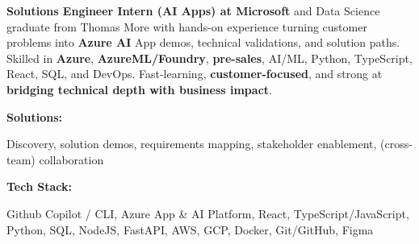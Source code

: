 \documentclass[8pt]{developercv} %
\begin{document}
\begin{minipage}[t]{0.46\textwidth}
	\vspace{-6pt}
 
	\textbf{Solutions Engineer Intern (AI Apps) at Microsoft} and Data Science graduate from Thomas More with hands-on experience turning customer problems into \textbf{Azure AI} App demos, technical validations, and solution paths. Skilled in \textbf{Azure}, \textbf{AzureML/Foundry}, \textbf{pre-sales}, AI/ML, Python, TypeScript, React, SQL, and DevOps. Fast-learning, \textbf{customer-focused}, and strong at \textbf{bridging technical depth with business impact}.
\end{minipage}
\hfill %
\begin{minipage}[t]{0.465\textwidth}
    \vspace{-6pt}
    
    \begin{minipage}[t]{0.2\textwidth}
        \textbf{Solutions:}
    \end{minipage}
    \hfill
    \begin{minipage}[t]{0.73\textwidth}
      Discovery, solution demos, requirements mapping, stakeholder enablement, (cross-team) collaboration
    \end{minipage}
    \vspace{1.5mm}
    
    \begin{minipage}[t]{0.2\textwidth}
        \textbf{Tech Stack:}
    \end{minipage}
    \hfill
    \begin{minipage}[t]{0.73\textwidth}
      Github Copilot / CLI, Azure App \& AI Platform, React, TypeScript/JavaScript, Python,  SQL, NodeJS, FastAPI, AWS, GCP, Docker, Git/GitHub, Figma
    \end{minipage}
    
\end{minipage}
\vspace{0.2cm}
\end{document}
